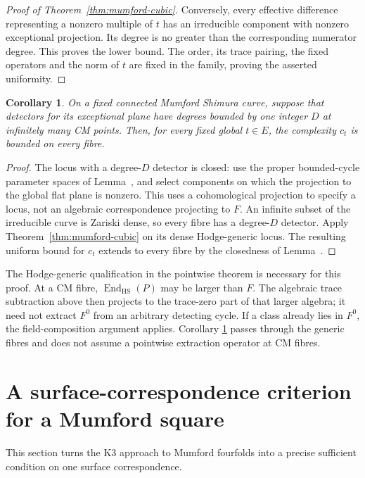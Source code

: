 \documentclass[11pt]{article}
\newtheorem{corollary}[theorem]{Corollary}
\theoremstyle{definition}
\theoremstyle{remark}
\begin{document}
\begin{proof}[Proof of Theorem~\ref{thm:mumford-cubic}]
Conversely, every effective difference representing a nonzero
multiple of $t$ has an irreducible component with nonzero
exceptional projection. Its degree is no greater than the
corresponding numerator degree. This proves the lower bound.
The order, its trace pairing, the fixed operators and the norm of
$t$ are fixed in the family, proving the asserted uniformity.
\end{proof}

\begin{corollary}\label{cor:mumford-family}
On a fixed connected Mumford Shimura curve, suppose that detectors
for its exceptional plane have degrees bounded by one integer $D$
at infinitely many CM points. Then, for every fixed global
$t\in E$, the complexity $c_t$ is bounded on every fibre.
\end{corollary}

\begin{proof}
The locus with a degree-$D$ detector is closed: use the proper
bounded-cycle parameter spaces of Lemma~, and
select components on which the projection to the global flat plane
is nonzero. This uses a cohomological projection to specify a
locus, not an algebraic correspondence projecting to $F$.
An infinite subset of the irreducible curve is Zariski dense, so
every fibre has a degree-$D$ detector. Apply
Theorem~\ref{thm:mumford-cubic} on its dense Hodge-generic locus.
The resulting uniform bound for $c_t$ extends to every fibre by
the closedness of Lemma~.
\end{proof}

The Hodge-generic qualification in the pointwise theorem is necessary
for this proof. At a CM fibre,
$\operatorname{End}_{\mathrm{HS}}(P)$ may be larger than $F$.
The algebraic trace subtraction above then projects to the
trace-zero part of that larger algebra; it need not extract $F^0$
from an arbitrary detecting cycle. If a class already lies in
$F^0$, the field-composition argument applies. Corollary
\ref{cor:mumford-family} passes through the generic fibres and does
not assume a pointwise extraction operator at CM fibres.

\section{A surface-correspondence criterion for a Mumford square}
\label{sec:mfg-surface-gate}

This section turns the K3 approach to Mumford fourfolds into a precise sufficient condition on one surface correspondence.
\end{document}
